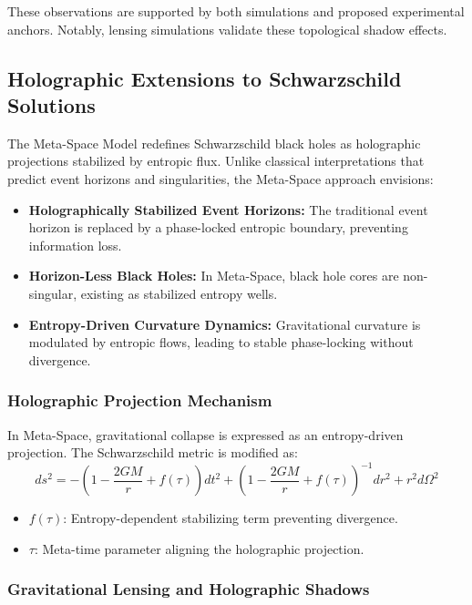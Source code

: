 \documentclass[10.5pt,a4paper]{article}
\begin{document}
These observations are supported by both simulations and proposed experimental anchors. Notably, lensing simulations validate these topological shadow effects.

\subsection{Holographic Extensions to Schwarzschild Solutions}

The Meta-Space Model redefines Schwarzschild black holes as holographic projections stabilized by entropic flux. 
Unlike classical interpretations that predict event horizons and singularities, the Meta-Space approach envisions:
\begin{itemize}
    \item \textbf{Holographically Stabilized Event Horizons:} The traditional event horizon is replaced by a phase-locked entropic boundary, preventing information loss.
    \item \textbf{Horizon-Less Black Holes:} In Meta-Space, black hole cores are non-singular, existing as stabilized entropy wells.
    \item \textbf{Entropy-Driven Curvature Dynamics:} Gravitational curvature is modulated by entropic flows, leading to stable phase-locking without divergence.
\end{itemize}

\subsubsection{Holographic Projection Mechanism}

In Meta-Space, gravitational collapse is expressed as an entropy-driven projection. The Schwarzschild metric is modified as:
\[
    ds^2 = -\left(1 - \frac{2GM}{r} + f(\tau)\right) dt^2 + \left(1 - \frac{2GM}{r} + f(\tau)\right)^{-1} dr^2 + r^2 d\Omega^2
\]

\begin{itemize}
    \item \( f(\tau) \): Entropy-dependent stabilizing term preventing divergence.
    \item \( \tau \): Meta-time parameter aligning the holographic projection.
\end{itemize}

\subsubsection{Gravitational Lensing and Holographic Shadows}
\end{document}
